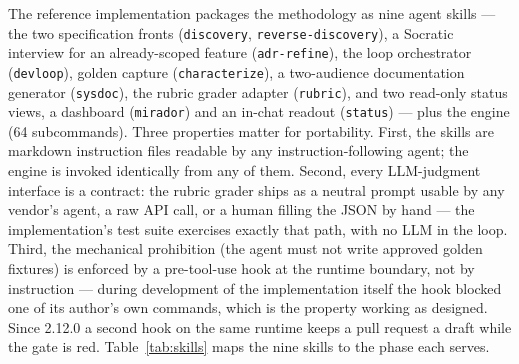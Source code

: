 \documentclass[11pt]{article}
\begin{document}
The reference implementation packages the methodology as nine agent skills
--- the two specification fronts (\texttt{discovery}, \texttt{reverse-discovery}),
a Socratic interview for an already-scoped feature (\texttt{adr-refine}), the
loop orchestrator (\texttt{devloop}), golden capture (\texttt{characterize}), a
two-audience documentation generator (\texttt{sysdoc}), the rubric grader adapter
(\texttt{rubric}), and two read-only status views, a dashboard
(\texttt{mirador}) and an in-chat readout (\texttt{status}) --- plus the engine
(64 subcommands). Three
properties matter for portability. First, the skills are markdown instruction
files readable by any instruction-following agent; the engine is invoked
identically from any of them. Second, every LLM-judgment interface is a
contract: the rubric grader ships as a neutral prompt usable by any vendor's
agent, a raw API call, or a human filling the JSON by hand --- the
implementation's test suite exercises exactly that path, with no LLM in the
loop. Third, the mechanical prohibition (the agent must not write approved
golden fixtures) is enforced by a pre-tool-use hook at the runtime boundary,
not by instruction --- during development of the implementation itself the hook
blocked one of its author's own commands, which is the property working as
designed. Since 2.12.0 a second hook on the same runtime keeps a pull request a draft while the gate is red. Table~\ref{tab:skills} maps the nine skills to the phase each serves.
\end{document}
